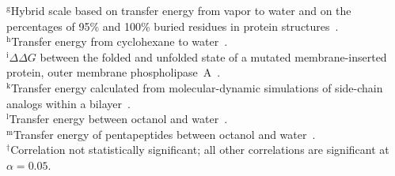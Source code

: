 \documentclass[11pt]{article}
\begin{document}
\begin{table}[H]
{\begin{raggedright}
$^\text{g}$Hybrid scale based on transfer energy from vapor to water and on the percentages of 95\% and 100\% buried residues in protein structures~\cite{Kyte1981}.\\
$^\text{h}$Transfer energy from cyclohexane to water~\cite{Radzicka1988}.\\
$^\text{i}$$\Delta\Delta G$ between the folded and unfolded state of a mutated membrane-inserted protein, outer membrane phospholipase~A~\cite{Moon2011}. \\
$^\text{k}$Transfer energy calculated from molecular-dynamic simulations of side-chain analogs within a bilayer~\cite{MacCallum2007}.\\
$^\text{l}$Transfer energy between octanol and water~\cite{Fauchere1983}.\\
$^\text{m}$Transfer energy of pentapeptides between octanol and water~\cite{Wimley1996}.\\
$^\dagger$Correlation not statistically significant; all other correlations are significant at $\alpha=0.05$.\\
\end{raggedright}
}
\end{table}
\end{document}
